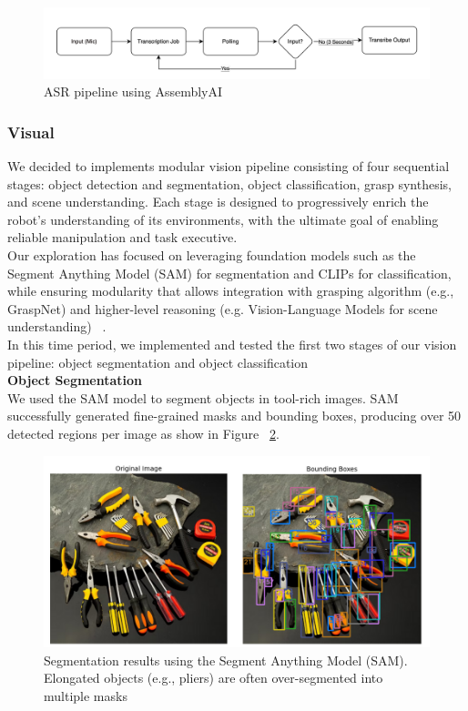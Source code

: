 \documentclass[12pt]{extarticle}
\begin{document}
\begin{figure}[H]
    \centering
    \includegraphics[width=\linewidth]{images/ASR_Pipeline.png}
    \caption{ASR pipeline using AssemblyAI}
    \label{fig: ASR_Pipeline.png}
\end{figure}

\subsubsection{Visual}
We decided to implements modular vision pipeline consisting of four sequential stages: object detection and segmentation, object classification, grasp synthesis, and scene understanding. Each stage is designed to progressively enrich the robot's understanding of its environments, with the ultimate goal of enabling reliable manipulation and task executive. \\

Our exploration has focused on leveraging foundation models such as the Segment Anything Model (SAM) for segmentation and CLIPs for classification, while ensuring modularity that allows integration with grasping algorithm (e.g., GraspNet) and higher-level reasoning (e.g. Vision-Language Models for scene understanding) ~\cite{segment-anything-2023,tlac-2025,hanwen2024_grasp,scene_seg}. \\

In this time period, we implemented and tested the first two stages of our vision pipeline: object segmentation and object classification \\


\textbf{Object Segmentation} \\


We used the SAM model to segment objects in tool-rich images. SAM successfully generated fine-grained masks and bounding boxes, producing over 50 detected regions per image as show in Figure ~\ref{fig: sam_pre}. 

\begin{figure}[H]
    \centering
    \includegraphics[width=\linewidth]{images/sam_pre.png}
    \caption{Segmentation results using the Segment Anything Model (SAM). 
    Elongated objects (e.g., pliers) are often over-segmented into multiple masks}
    \label{fig: sam_pre}
\end{figure}
\end{document}
